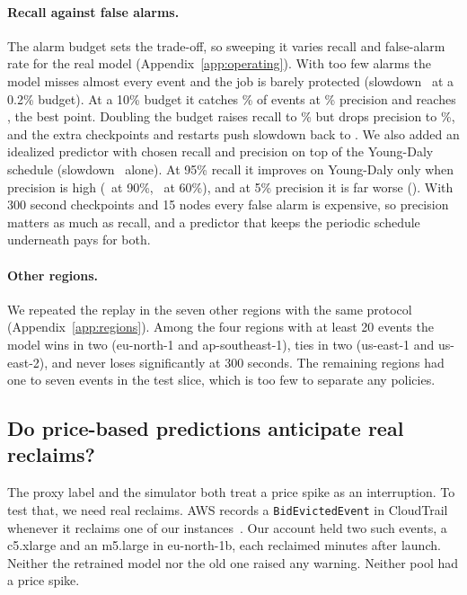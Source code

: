 \documentclass{article}
\begin{document}
\paragraph{Recall against false alarms.} The alarm budget sets the trade-off, so sweeping it varies recall and false-alarm rate for the real model (Appendix~\ref{app:operating}). With too few alarms the model misses almost every event and the job is barely protected (slowdown \opSlowTiny\ at a 0.2\% budget). At a 10\% budget it catches \opRecallTen\% of events at \opPrecTen\% precision and reaches \opSlowTen, the best point. Doubling the budget raises recall to \opRecallTwenty\% but drops precision to \opPrecTwenty\%, and the extra checkpoints and restarts push slowdown back to \opSlowTwenty. We also added an idealized predictor with chosen recall and precision on top of the Young-Daly schedule (slowdown \ydSlowThreeHundred\ alone). At 95\% recall it improves on Young-Daly only when precision is high (\synthBest\ at 90\%, \synthSixty\ at 60\%), and at 5\% precision it is far worse (\synthLowP). With 300 second checkpoints and 15 nodes every false alarm is expensive, so precision matters as much as recall, and a predictor that keeps the periodic schedule underneath pays for both.

\begin{table}[t]
  \centering
  \caption{Slowdown against ideal (1.0 is no loss) for a 15-node job, by checkpoint time. Bold marks the best non-oracle entry where the model wins.}
  \label{tab:bench}
  \small
  
\end{table}

\paragraph{Other regions.} We repeated the replay in the seven other regions with the same protocol (Appendix~\ref{app:regions}). Among the four regions with at least 20 events the model wins in two (eu-north-1 and ap-southeast-1), ties in two (us-east-1 and us-east-2), and never loses significantly at 300 seconds. The remaining regions had one to seven events in the test slice, which is too few to separate any policies.

\subsection{Do price-based predictions anticipate real reclaims?}
\label{sec:real}

The proxy label and the simulator both treat a price spike as an interruption. To test that, we need real reclaims. AWS records a \texttt{BidEvictedEvent} in CloudTrail whenever it reclaims one of our instances~\citep{aws-cloudtrail-spot}. Our account held two such events, a c5.xlarge and an m5.large in eu-north-1b, each reclaimed minutes after launch. Neither the retrained model nor the old one raised any warning. Neither pool had a price spike.
\end{document}
